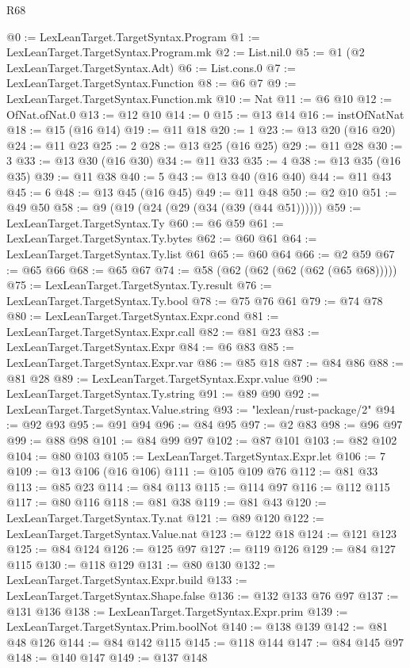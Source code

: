 \begin{lexlean}{R68}
\begin{coremodule}
@0 := LexLeanTarget.TargetSyntax.Program
@1 := LexLeanTarget.TargetSyntax.Program.mk
@2 := List.nil.{0}
@5 := @1 (@2 LexLeanTarget.TargetSyntax.Adt)
@6 := List.cons.{0}
@7 := LexLeanTarget.TargetSyntax.Function
@8 := @6 @7
@9 := LexLeanTarget.TargetSyntax.Function.mk
@10 := Nat
@11 := @6 @10
@12 := OfNat.ofNat.{0}
@13 := @12 @10
@14 := 0
@15 := @13 @14
@16 := instOfNatNat
@18 := @15 (@16 @14)
@19 := @11 @18
@20 := 1
@23 := @13 @20 (@16 @20)
@24 := @11 @23
@25 := 2
@28 := @13 @25 (@16 @25)
@29 := @11 @28
@30 := 3
@33 := @13 @30 (@16 @30)
@34 := @11 @33
@35 := 4
@38 := @13 @35 (@16 @35)
@39 := @11 @38
@40 := 5
@43 := @13 @40 (@16 @40)
@44 := @11 @43
@45 := 6
@48 := @13 @45 (@16 @45)
@49 := @11 @48
@50 := @2 @10
@51 := @49 @50
@58 := @9 (@19 (@24 (@29 (@34 (@39 (@44 @51))))))
@59 := LexLeanTarget.TargetSyntax.Ty
@60 := @6 @59
@61 := LexLeanTarget.TargetSyntax.Ty.bytes
@62 := @60 @61
@64 := LexLeanTarget.TargetSyntax.Ty.list @61
@65 := @60 @64
@66 := @2 @59
@67 := @65 @66
@68 := @65 @67
@74 := @58 (@62 (@62 (@62 (@62 (@65 @68)))))
@75 := LexLeanTarget.TargetSyntax.Ty.result
@76 := LexLeanTarget.TargetSyntax.Ty.bool
@78 := @75 @76 @61
@79 := @74 @78
@80 := LexLeanTarget.TargetSyntax.Expr.cond
@81 := LexLeanTarget.TargetSyntax.Expr.call
@82 := @81 @23
@83 := LexLeanTarget.TargetSyntax.Expr
@84 := @6 @83
@85 := LexLeanTarget.TargetSyntax.Expr.var
@86 := @85 @18
@87 := @84 @86
@88 := @81 @28
@89 := LexLeanTarget.TargetSyntax.Expr.value
@90 := LexLeanTarget.TargetSyntax.Ty.string
@91 := @89 @90
@92 := LexLeanTarget.TargetSyntax.Value.string
@93 := "lexlean/rust-package/2"
@94 := @92 @93
@95 := @91 @94
@96 := @84 @95
@97 := @2 @83
@98 := @96 @97
@99 := @88 @98
@101 := @84 @99 @97
@102 := @87 @101
@103 := @82 @102
@104 := @80 @103
@105 := LexLeanTarget.TargetSyntax.Expr.let
@106 := 7
@109 := @13 @106 (@16 @106)
@111 := @105 @109 @76
@112 := @81 @33
@113 := @85 @23
@114 := @84 @113
@115 := @114 @97
@116 := @112 @115
@117 := @80 @116
@118 := @81 @38
@119 := @81 @43
@120 := LexLeanTarget.TargetSyntax.Ty.nat
@121 := @89 @120
@122 := LexLeanTarget.TargetSyntax.Value.nat
@123 := @122 @18
@124 := @121 @123
@125 := @84 @124
@126 := @125 @97
@127 := @119 @126
@129 := @84 @127 @115
@130 := @118 @129
@131 := @80 @130
@132 := LexLeanTarget.TargetSyntax.Expr.build
@133 := LexLeanTarget.TargetSyntax.Shape.false
@136 := @132 @133 @76 @97
@137 := @131 @136
@138 := LexLeanTarget.TargetSyntax.Expr.prim
@139 := LexLeanTarget.TargetSyntax.Prim.boolNot
@140 := @138 @139
@142 := @81 @48 @126
@144 := @84 @142 @115
@145 := @118 @144
@147 := @84 @145 @97
@148 := @140 @147
@149 := @137 @148

\end{coremodule}
\end{lexlean}
